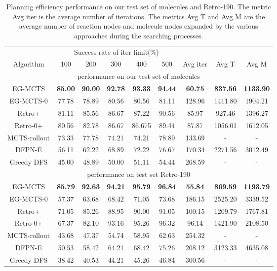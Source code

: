 \documentclass[sn-mathphys,Numbered]{sn-jnl}
\begin{document}
\begin{table}[!ht]
\caption{Planning efficiency performance on our test set of  molecules and Retro-190. The metric Avg iter is the average number of iterations. The metrics Avg T and Avg M are the average number of reaction nodes and molecule nodes expanded by the various approaches during the searching processes.  }
\label{table-efficiency}

  \centering
  \begin{tabular}{ccccccccc}
    \toprule
    & \multicolumn{5}{c}{Success rate of iter limit(\%)}  \\
    \cmidrule(r){2-6}
    Algorithm   & 100  & 200  & 300  & 400  & 500  & Avg iter & Avg T & Avg M\\
    \midrule
    \multicolumn{9}{c}{performance on our test set of  molecules}  \\
    \midrule
    EG-MCTS     & \textbf{85.00} & \textbf{90.00} & \textbf{92.78} & \textbf{93.33} & \textbf{94.44}  & \textbf{60.75}  & \textbf{837.56}         & \textbf{1133.90}\\
    EG-MCTS-0               & 77.78 & 78.89 & 80.56 & 80.56 & 81.11        & 128.96   & 1411.80                  & 1904.21\\
    Retro+                  & 81.11 & 85.56 & 86.67 & 87.22 & 90.56    & 85.97   & 927.46     & 1396.27 \\
    Retro-0+                & 80.56 & 82.78 & 86.67 & 86.675 & 89.44        & 87.87   & 1056.01                 & 1612.05 \\
    MCTS-rollout      & 73.33 & 77.78 & 74.21 & 74.21 & 78.89        & 133.69   & -                 & -\\
    DFPN-E     & 56.11 & 62.22 & 68.89 & 72.22 & 76.67        & 170.34   & 2271.56     & 3012.49  \\
    Greedy DFS      & 45.00 & 48.89 & 50.00 & 51.11 & 54.44        & 268.59   & -      & -    \\
    \midrule
    \multicolumn{9}{c}{performance on test set Retro-190}  \\
    \midrule
    EG-MCTS     & \textbf{85.79} & \textbf{92.63} & \textbf{94.21} & \textbf{95.79} & \textbf{96.84}        & \textbf{55.84 }    & \textbf{869.59 }                & \textbf{1193.79}\\
    EG-MCTS-0               & 57.37 & 63.68 & 68.42 & 71.05 & 73.68        & 186.15  & 2525.20                  & 3339.52\\
    Retro+       & 71.05 & 85.26 & 88.95 & 90.00 & 91.05   & 100.15   & 1209.79         & 1767.81 \\
    Retro-0+               & 67.37 & 82.10 & 93.16 & 95.26 & 96.32        & 96.14   & 1421.90                 & 2108.50 \\
    MCTS-rollout      & 43.68 & 47.37 & 54.74 & 58.95 & 62.63     & 254.32   & -   & -\\
    DFPN-E       & 50.53 & 58.42 & 64.21 & 68.42 & 75.26    & 208.12   & 3123.33       & 4635.08  \\
    Greedy DFS              & 38.42 & 40.53 & 44.21 & 45.26 & 46.84        & 300.56   & -                 & -    \\
    \bottomrule  
    

\end{tabular}
\end{table}
\end{document}
